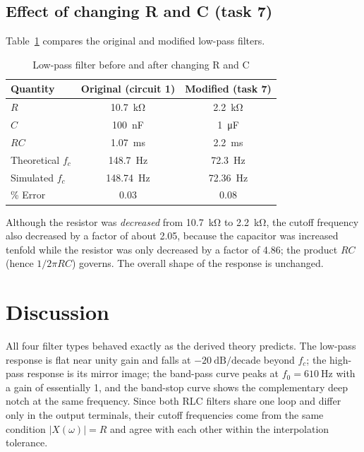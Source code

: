 \documentclass[12pt,a4paper]{article}
\begin{document}
	\subsection{Effect of changing R and C (task 7)}
	Table~\ref{tab:task7} compares the original and modified low-pass
	filters.
	
	\begin{table}[H]
		\centering
		\caption{Low-pass filter before and after changing R and C}
		\label{tab:task7}
		\renewcommand{\arraystretch}{1.25}
		\begin{tabular}{|l|c|c|}
			\hline
			\rowcolor{black!12}\textbf{Quantity} & \textbf{Original (circuit 1)} & \textbf{Modified (task 7)} \\
			\hline
			$R$ & \SI{10.7}{\kilo\ohm} & \SI{2.2}{\kilo\ohm} \\
			\hline
			$C$ & \SI{100}{\nano\farad} & \SI{1}{\micro\farad} \\
			\hline
			$RC$ & \SI{1.07}{\milli\second} & \SI{2.2}{\milli\second} \\
			\hline
			Theoretical $f_c$ & \SI{148.7}{\hertz} & \SI{72.3}{\hertz} \\
			\hline
			Simulated $f_c$ & \SI{148.74}{\hertz} & \SI{72.36}{\hertz} \\
			\hline
			\% Error & $0.03$ & $0.08$ \\
			\hline
		\end{tabular}
	\end{table}
	
	Although the resistor was \emph{decreased} from
	\SI{10.7}{\kilo\ohm} to \SI{2.2}{\kilo\ohm}, the cutoff frequency also
	decreased by a factor of about 2.05, because the capacitor was
	increased tenfold while the resistor was only decreased by a factor of
	4.86; the product $RC$ (hence $1/2\pi RC$) governs. The overall shape
	of the response is unchanged.
	
	\section{Discussion}
	All four filter types behaved exactly as the derived theory predicts.
	The low-pass response is flat near unity gain and falls at
	$-20\ \mathrm{dB/decade}$ beyond $f_c$; the high-pass response is its
	mirror image; the band-pass curve peaks at $f_0 = \SI{610}{\hertz}$
	with a gain of essentially 1, and the band-stop curve shows the
	complementary deep notch at the same frequency. Since both RLC filters
	share one loop and differ only in the output terminals, their cutoff
	frequencies come from the same condition $|X(\omega)| = R$ and agree
	with each other within the interpolation tolerance.
	
\end{document}
